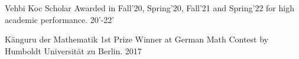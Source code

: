 
\begin{cvhonors}
  \cvhonor
    {Vehbi Koc Scholar}
    {Awarded in Fall’20, Spring’20, Fall’21 and Spring'22 for high academic performance.}
    {}
    {20’-22’}

  \cvhonor
    {Känguru der Mathematik}
    {1st Prize Winner at German Math Contest by Humboldt Universität zu Berlin.}
    {}
    {2017}

\end{cvhonors}
